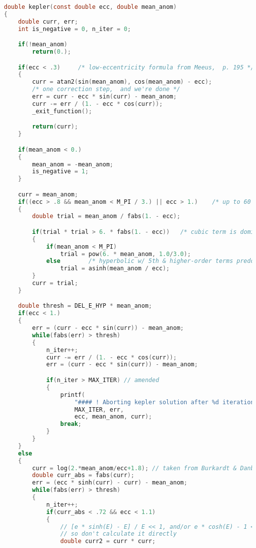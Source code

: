 \begin{lstlisting}[language=C]
double kepler(const double ecc, double mean_anom)
{
    double curr, err;
    int is_negative = 0, n_iter = 0;

    if(!mean_anom)
        return(0.);

    if(ecc < .3)     /* low-eccentricity formula from Meeus,  p. 195 */
    {
        curr = atan2(sin(mean_anom), cos(mean_anom) - ecc);
        /* one correction step,  and we're done */
        err = curr - ecc * sin(curr) - mean_anom;
        curr -= err / (1. - ecc * cos(curr));
        _exit_function();

        return(curr);
    }

    if(mean_anom < 0.)
    {
        mean_anom = -mean_anom;
        is_negative = 1;
    }

    curr = mean_anom;
    if((ecc > .8 && mean_anom < M_PI / 3.) || ecc > 1.)    /* up to 60 degrees */
    {
        double trial = mean_anom / fabs(1. - ecc);

        if(trial * trial > 6. * fabs(1. - ecc))   /* cubic term is dominant */
        {
            if(mean_anom < M_PI)
                trial = pow(6. * mean_anom, 1.0/3.0);
            else        /* hyperbolic w/ 5th & higher-order terms predominant */
                trial = asinh(mean_anom / ecc);
        }
        curr = trial;
    }

    double thresh = DEL_E_HYP * mean_anom;
    if(ecc < 1.)
    {
        err = (curr - ecc * sin(curr)) - mean_anom;
        while(fabs(err) > thresh)
        {
            n_iter++;
            curr -= err / (1. - ecc * cos(curr));
            err = (curr - ecc * sin(curr)) - mean_anom;

            if(n_iter > MAX_ITER) // amended
            {
                printf(
                    "#### ! Aborting kepler solution after %d iterations, keeping error of %e (e=%e, M=%e, E_=%e) ####\n",
                    MAX_ITER, err,
                    ecc, mean_anom, curr);
                break;
            }
        }
    }
    else
    {
        curr = log(2.*mean_anom/ecc+1.8); // taken from Burkardt & Danby, CeMec 31 (1983), 317-328
        double curr_abs = fabs(curr);
        err = (ecc * sinh(curr) - curr) - mean_anom;
        while(fabs(err) > thresh)
        {
            n_iter++;
            if(curr_abs < .72 && ecc < 1.1)
            {
                // [e * sinh(E) - E] / E << 1, and/or e * cosh(E) - 1 << 1
                // so don't calculate it directly
                double curr2 = curr * curr;


\end{lstlisting}
